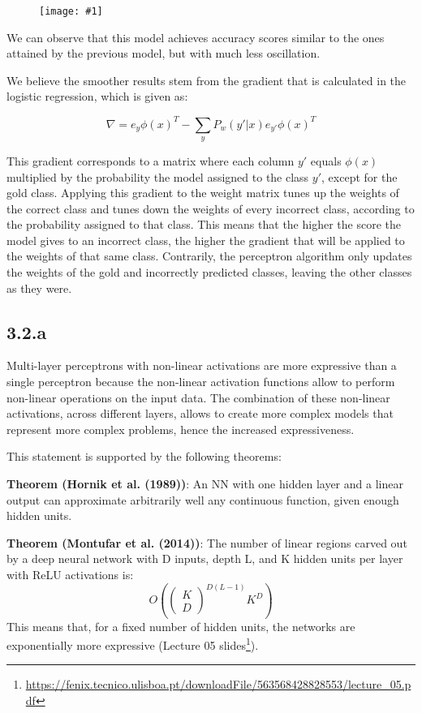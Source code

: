 \documentclass[10pt]{article}
\newcommand{\img}[1]{\begin{figure}[H]\centering\texttt{[image: \#1]}\end{figure}}
\begin{document}
\img{results/q3/1_b/acc_10-epochs_lr-1e-3.png}

We can observe that this model achieves accuracy scores similar to the ones attained by the previous model, but with much less oscillation. 

We believe the smoother results stem from the gradient that is calculated in the logistic regression, which is given as:

$$
\nabla = e_y \phi(x)^T - \sum_y P_w(y' | x)e_{y'}\phi(x)^T
$$

This gradient corresponds to a matrix where each column $y'$ equals $\phi(x)$ multiplied by the probability the model assigned to the class $y'$, except for the gold class.
Applying this gradient to the weight matrix tunes up the weights of the correct class and tunes down the weights of every incorrect class, according to the probability assigned to that class.
This means that the higher the score the model gives to an incorrect class, the higher the gradient that will be applied to the weights of that same class.
Contrarily, the perceptron algorithm only updates the weights of the gold and incorrectly predicted classes, leaving the other classes as they were.

\subsection{3.2.a}
Multi-layer perceptrons with non-linear activations are more expressive than a single perceptron because the non-linear activation functions allow to perform non-linear operations on the input data. The combination of these non-linear activations, across different layers, allows to create more complex models that represent more complex problems, hence the increased expressiveness.

This statement is supported by the following theorems:

\textbf{Theorem (Hornik et al. (1989))}: An NN with one hidden layer and a linear output can approximate arbitrarily well any continuous function, given enough hidden units.

\textbf{Theorem (Montufar et al. (2014))}: The number of linear regions carved out by a deep neural network with D inputs, depth L, and K hidden units per layer with ReLU activations is:
$$
O\left(
  \left(
  \begin{array}{ll}
    K
    \\
    D
  \end{array}
  \right)^{D(L-1)} K^D
\right)
$$
This means that, for a fixed number of hidden units, the networks are exponentially more expressive (Lecture 05 slides\footnote{\url{https://fenix.tecnico.ulisboa.pt/downloadFile/563568428828553/lecture_05.pdf}}).
\end{document}
